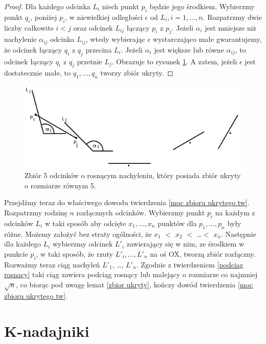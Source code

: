 \documentclass[brudnopis]{xmgr}
\theoremstyle{definition}
\begin{document}
\begin{proof}
	Dla każdego odcinka $L_i$ niech punkt $p_i$ będzie jego środkiem. Wybierzmy punkt $q_i$, poniżej $p_i$, w niewielkiej odległości $\epsilon$ od $L_i, i = 1,\ldots,n$. Rozpatrzmy dwie liczby całkowite $i < j$ oraz odcinek $L_{ij}$ łączący $p_i$ z $p_j$. Jeżeli $\alpha_i$ jest mniejsze niż nachylenie $\alpha_{ij}$ odcinka $L_{ij}$, wtedy wybierając $\epsilon$ wystarczająco małe gwarantujemy, że odcinek łączący $q_i$ z $q_j$ przecina $L_i$. Jeżeli $\alpha_i$ jest większe lub równe $\alpha_{ij}$, to odcinek łączący $q_i$ z $q_j$ przetnie $L_j$. Obrazuje to rysunek \ref{fig:5 zbior ukryty}. A zatem, jeżeli $\epsilon$ jest dostatecznie małe, to  $q_1, \ldots, q_n$ tworzy zbiór ukryty. 
\end{proof}
\begin{figure}[ht!]
  \centering
   \includegraphics{rysunki/5_odcinkow_zbior_ukryty.png}
   \caption{Zbiór 5 odcinków o rosnącym nachyleniu, który posiada zbiór ukryty o rozmiarze równym 5.}
   \label{fig:5 zbior ukryty}
\end{figure}
\indent Przejdźmy teraz do właściwego dowodu twierdzenia \ref{moc zbioru ukrytego tw}. Rozpatrzmy rodzinę $n$ rozłącznych odcinków. Wybierzmy punkt $p_i$ na każdym z odcinków $L_i$ w taki sposób aby odcięte $x_1,\ldots, x_n$  punktów dla $p_1,\ldots,p_n$ były różne. Możemy założyć bez straty ogólności, że $x_1$ $<$ $x_2$ $<$ \ldots $<$ $x_n$. Następnie dla każdego $L_i$ wybierzmy odcinek $L'_i$ zawierający się w nim, ze środkiem w punkcie $p_i$, w taki sposób, że rzuty $L'_i,\ldots,L'_n$ na oś OX, tworzą zbiór rozłączny. Rozważmy teraz ciąg nachyleń $L'_1$, \ldots, $L'_n$. Zgodnie z twierdzeniem \ref{podciag rosnacy} taki ciąg zawiera podciąg rosnący lub malejący o rozmiarze co najmniej $\sqrt{n}$, co biorąc pod uwagę lemat \ref{zbior ukryty}, kończy dowód twierdzenia \ref{moc zbioru ukrytego tw}.

\chapter{K-nadajniki}
\end{document}
